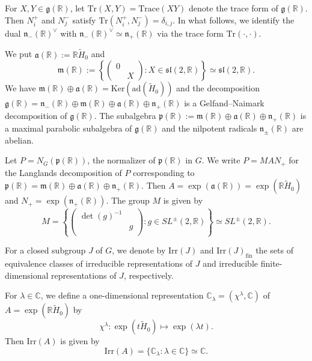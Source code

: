 \documentclass[reqno,11pt]{amsart}
\theoremstyle{remark}
\numberwithin{equation}{section}
\newcommand{\fa}{{\mathfrak a}}
\newcommand{\fg}{{\mathfrak g}}
\newcommand{\fm}{{\mathfrak m}}
\newcommand{\fn}{{\mathfrak n}}
\newcommand{\fp}{{\mathfrak p}}
\newcommand{\f}{\mathfrak}
\newcommand{\R}{\mathbb{R}}
\newcommand{\C}{\mathbb{C}}
\newcommand{\ad}{\mathrm{ad}}
\newcommand{\Tr}{\text{Tr}}
\newcommand{\Irr}{\mathrm{Irr}}
\newcommand{\fin}{\mathrm{fin}}
\newcommand{\wH}{\widetilde{H}}
\newcommand{\Ker}{\mathrm{Ker}}
\begin{document}
For $X, Y \in \fg(\R)$, let $\Tr(X,Y)=\text{Trace}(XY)$ denote the trace form of $\fg(\R)$. 
Then $N_i^+$ and $N_j^-$ satisfy $\Tr(N_i^+,N_j^-)=\delta_{i,j}$.
In what follows, we identify  the dual $\fn_-(\R)^\vee$
with $\fn_-(\R)^\vee \simeq \fn_+(\R)$ via the trace form $\Tr(\cdot, \cdot)$.

We put $\fa(\R):= \R \wH_0$ and
\begin{equation}\label{eqn:Lm}
\fm(\R):= \left\{
\begin{pmatrix}
0 & \\
 & X
\end{pmatrix}
:
X \in \f{sl}(2,\R)
\right\}\simeq \f{sl}(2,\R).
\end{equation}
We have $\fm(\R)\oplus \fa(\R) = \Ker(\ad(\wH_0))$ and
the decomposition
$\fg(\R) = \fn_-(\R) \oplus \fm(\R) \oplus \fa(\R) \oplus \fn_+(\R)$
is a Gelfand--Naimark decomposition of $\fg(\R)$.
The subalgebra
$\fp(\R):=\fm(\R) \oplus \fa(\R) \oplus \fn_+(\R)$ is a maximal parabolic 
subalgebra of $\fg(\R)$ and the nilpotent radicals $\fn_{\pm}(\R)$ are abelian.

Let $P=N_G(\fp(\R))$, the normalizer of $\fp(\R)$ in $G$. 
We write $P=MAN_+$ for the Langlands decomposition of $P$ corresponding to 
$\fp(\R)=\fm(\R) \oplus \fa(\R) \oplus \fn_+(\R)$. 
Then $A = \exp(\fa(\R)) = \exp(\R \wH_0)$ and 
$N_+=\exp(\fn_+(\R))$. The group $M$ is given by
\begin{equation*}
M= 
\left\{
\begin{pmatrix}
\det(g)^{-1} &\\
& g\\
\end{pmatrix}
:
g \in SL^{\pm}(2,\R)
\right\}\simeq SL^{\pm}(2,\R).
\end{equation*}

For a closed subgroup $J$ of $G$, we denote by $\Irr(J)$ and $\Irr(J)_{\fin}$
the sets of equivalence classes of irreducible representations of $J$  and 
irreducible finite-dimensional representations of $J$, respectively.

For $\lambda \in \C$, 
we define a one-dimensional representation 
$\C_\lambda=(\chi^\lambda, \C)$ of $A=\exp(\R\wH_0)$ by
\begin{equation}\label{eqn:chi}
\chi^\lambda \colon \exp(t \wH_0) \longmapsto \exp(\lambda t).
\end{equation}
Then $\Irr(A)$ is given by
\begin{equation*}
\Irr(A)=\{\C_\lambda : \lambda \in \C\} \simeq \C.
\end{equation*}
\end{document}
